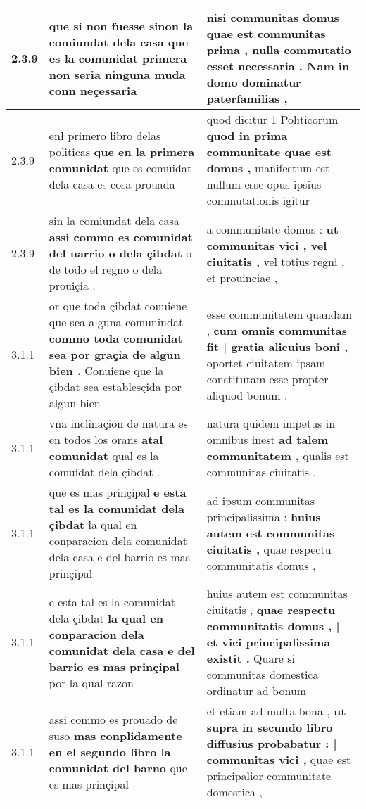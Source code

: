 \begin{tabular}{|p{1cm}|p{6.5cm}|p{6.5cm}|}
2.3.9 & que si non fuesse sinon la comiundat dela casa \textbf{ que es la comunidat primera } non seria ninguna muda conn neçessaria & nisi communitas domus \textbf{ quae est communitas prima , } nulla commutatio esset necessaria . Nam in domo dominatur paterfamilias , \\\hline
2.3.9 & enł primero libro delas politicas \textbf{ que en la primera comunidat } que es comuidat dela casa es cosa prouada & quod dicitur 1 Politicorum \textbf{ quod in prima communitate quae est domus , } manifestum est nullum esse opus ipsius commutationis igitur \\\hline
2.3.9 & sin la comiundat dela casa \textbf{ assi commo es comunidat del uarrio o dela çibdat } o de todo el regno o dela prouiçia . & a communitate domus : \textbf{ ut communitas vici , vel ciuitatis , } vel totius regni , et prouinciae , \\\hline
3.1.1 & or que toda çibdat conuiene que sea alguna comunindat \textbf{ commo toda comunidat sea por graçia de algun bien . } Conuiene que la çibdat sea establesçida por algun bien & esse communitatem quandam , \textbf{ cum omnis communitas fit | gratia alicuius boni , } oportet ciuitatem ipsam constitutam esse propter aliquod bonum . \\\hline
3.1.1 & vna inclinaçion de natura es en todos los orans \textbf{ atal comunidat } qual es la comuidat dela çibdat . & natura quidem impetus in omnibus inest \textbf{ ad talem communitatem , } qualis est communitas ciuitatis . \\\hline
3.1.1 & que es mas prinçipal \textbf{ e esta tal es la comunidat dela çibdat } la qual en conparacion dela comunidat dela casa e del barrio es mas prinçipal & ad ipsum communitas principalissima : \textbf{ huius autem est communitas ciuitatis , } quae respectu communitatis domus , \\\hline
3.1.1 & e esta tal es la comunidat dela çibdat \textbf{ la qual en conparacion dela comunidat dela casa e del barrio es mas prinçipal } por la qual razon & huius autem est communitas ciuitatis , \textbf{ quae respectu communitatis domus , | et vici principalissima existit . } Quare si communitas domestica ordinatur ad bonum \\\hline
3.1.1 & assi commo es prouado de suso \textbf{ mas conplidamente en el segundo libro la comunidat del barno } que es mas prinçipal & et etiam ad multa bona , \textbf{ ut supra in secundo libro diffusius probabatur : | communitas vici , } quae est principalior communitate domestica , \\\hline

\end{tabular}
